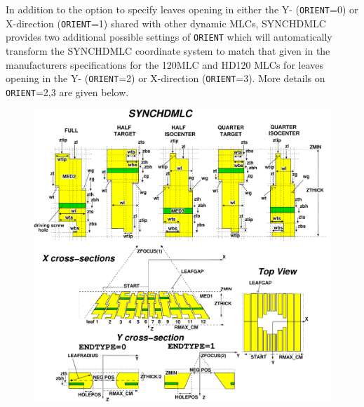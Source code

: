 \documentclass[12pt,twoside]{article}
\begin{document}
In addition to the option to specify leaves opening in either the Y- ({\tt ORIENT}=0) or X-direction ({\tt ORIENT}=1)
shared with other dynamic MLCs, SYNCHDMLC provides two additional possible settings of {\tt ORIENT} which
will automatically transform the SYNCHDMLC coordinate system to match that given in the manufacturers specifications
for the 120MLC and HD120 MLCs for leaves opening in the Y- ({\tt ORIENT}=2) or X-direction ({\tt ORIENT}=3).  More
details on {\tt ORIENT}=2,3 are given below.

\begin{figure}[htpb]
\begin{center}
\vspace*{-0.7cm}
\leavevmode
\begin{latexonly}
\hspace*{-2.5cm}
\includegraphics[width=21cm]{figures/synchdmlcd}
\end{latexonly}
\begin{htmlonly}

\end{htmlonly}
\end{center}
\end{figure}
\end{document}
